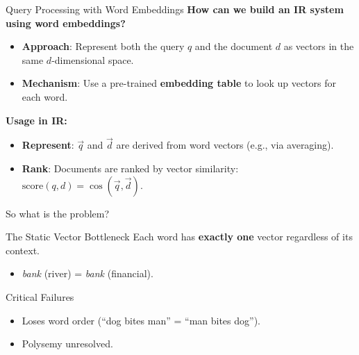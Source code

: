 \documentclass[aspectratio=169]{beamer}
\newif\ifanimated
\newcommand{\cpause}{\ifanimated\pause\fi}
\begin{document}
\begin{frame}{Query Processing with Word Embeddings}
\textbf{How can we build an IR system using word embeddings?}

\cpause
\begin{itemize}
    \item \textbf{Approach}: Represent both the query $q$ and the document $d$ as vectors in the same $d$-dimensional space.
    \item \textbf{Mechanism}: Use a pre-trained \textbf{embedding table} to look up vectors for each word.
\end{itemize}

\begin{center}

\end{center}\cpause

\textbf{Usage in IR:}
\begin{itemize}
    \item \textbf{Represent}: $\vec{q}$ and $\vec{d}$ are derived from word vectors (e.g., via averaging).
    \item \textbf{Rank}: Documents are ranked by vector similarity: $\text{score}(q, d) = \cos(\vec{q}, \vec{d})$.
\end{itemize}
\end{frame}

\begin{frame}{So what is the problem?}
\cpause
\begin{alertblock}{The Static Vector Bottleneck}
Each word has \textbf{exactly one} vector regardless of its context.
\begin{itemize}
    \item \textit{bank} (river) = \textit{bank} (financial).
\end{itemize}
\end{alertblock}

\vspace{1em}
\cpause
\begin{alertblock}{Critical Failures}
\begin{itemize}
    \item Loses word order (``dog bites man'' = ``man bites dog'').
    \item Polysemy unresolved.
\end{itemize}
\end{alertblock}
\end{frame}
\end{document}
